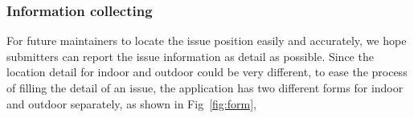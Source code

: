 \documentclass{acm_proc_article-sp}
\begin{document}
 \subsubsection{Information collecting}
 For future maintainers to locate the issue position easily and accurately, we hope submitters can report the issue information
 as detail as possible. Since the location detail for indoor and outdoor could be very different, to ease the process of filling the detail
 of an issue, the application has two different forms for indoor and outdoor separately, as shown in Fig~\ref{fig:form}, 
 \begin{figure}[!t]
 \centering

\end{figure}
\end{document}
